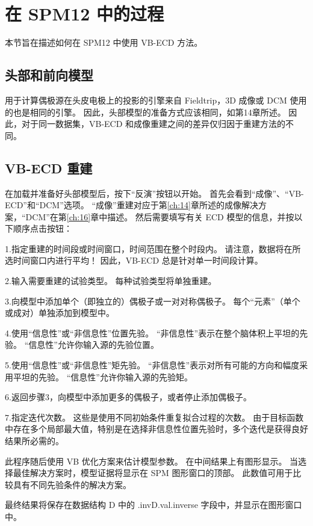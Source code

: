 \section{在 SPM12 中的过程}

本节旨在描述如何在 SPM12 中使用 VB-ECD 方法。


\subsection{头部和前向模型}

用于计算偶极源在头皮电极上的投影的引擎来自 Fieldtrip，3D 成像或 DCM 使用的也是相同的引擎。
因此，头部模型的准备方式应该相同，如第14章所述。
因此，对于同一数据集，VB-ECD 和成像重建之间的差异仅归因于重建方法的不同。


\subsection{VB-ECD 重建}

在加载并准备好头部模型后，按下“反演”按钮以开始。
首先会看到“成像”、“VB-ECD”和“DCM”选项。
“成像”重建对应于第\ref{ch:14}章所述的成像解决方案，“DCM”在第\ref{ch:16}章中描述。
然后需要填写有关 ECD 模型的信息，并按以下顺序点击按钮：

1.指定重建的时间段或时间窗口，时间范围在整个时段内。
请注意，数据将在所选时间窗口内进行平均！
因此，VB-ECD 总是针对单一时间段计算。

2.输入需要重建的试验类型。
每种试验类型将单独重建。

3.向模型中添加单个（即独立的）偶极子或一对对称偶极子。
每个“元素”（单个或成对）单独添加到模型中。

4.使用“信息性”或“非信息性”位置先验。
“非信息性”表示在整个脑体积上平坦的先验。
“信息性”允许你输入源的先验位置。

5.使用“信息性”或“非信息性”矩先验。
“非信息性”表示对所有可能的方向和幅度采用平坦的先验。
“信息性”允许你输入源的先验矩。

6.返回步骤3，向模型中添加更多的偶极子，或者停止添加偶极子。

7.指定迭代次数。
这些是使用不同初始条件重复拟合过程的次数。
由于目标函数中存在多个局部最大值，特别是在选择非信息性位置先验时，多个迭代是获得良好结果所必需的。

此程序随后使用 VB 优化方案来估计模型参数。
在中间结果上有图形显示。
当选择最佳解决方案时，模型证据将显示在 SPM 图形窗口的顶部。
此数值可用于比较具有不同先验条件的解决方案。

最终结果将保存在数据结构 D 中的 .inv{D.val}.inverse 字段中，并显示在图形窗口中。


